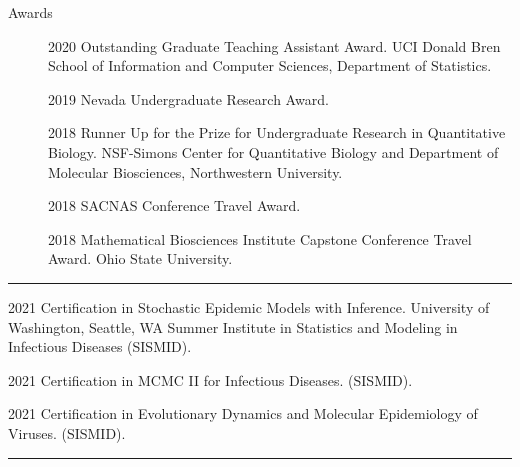 \documentclass{article}
\begin{document}
\begin{description}
	\vspace{-2mm}
	\item[Awards]\hspace*{.1in}
	
		2020 Outstanding Graduate Teaching Assistant Award. UCI Donald Bren School of Information and Computer Sciences, Department of Statistics.
		\vspace*{1mm}
		
		2019 Nevada Undergraduate Research Award.
		\vspace*{1mm}
		
		2018 Runner Up for the Prize for Undergraduate Research in Quantitative Biology. NSF-Simons Center for Quantitative Biology and Department of Molecular Biosciences, Northwestern University.
		\vspace*{1mm}
		
		2018 SACNAS Conference Travel Award.
		\vspace*{1mm}
		
		2018 Mathematical Biosciences Institute Capstone Conference Travel Award. Ohio State University.
	
\end{description}
\vspace{-2mm}
\rule{\linewidth}{1pt}




\begin{description}
	\vspace{-2mm}
	\item[Certifications]\hspace*{.01in}
	
		2021 Certification in Stochastic Epidemic Models with Inference. University of Washington, Seattle, WA Summer Institute in Statistics and Modeling in Infectious Diseases (SISMID).
		\vspace*{1mm}
		
		2021 Certification in MCMC II for Infectious Diseases. (SISMID).
		\vspace*{1mm}
		
		2021 Certification in Evolutionary Dynamics and Molecular Epidemiology of Viruses. (SISMID).
	
\end{description}
\vspace{-2mm}
\rule{\linewidth}{1pt}


\end{document}
